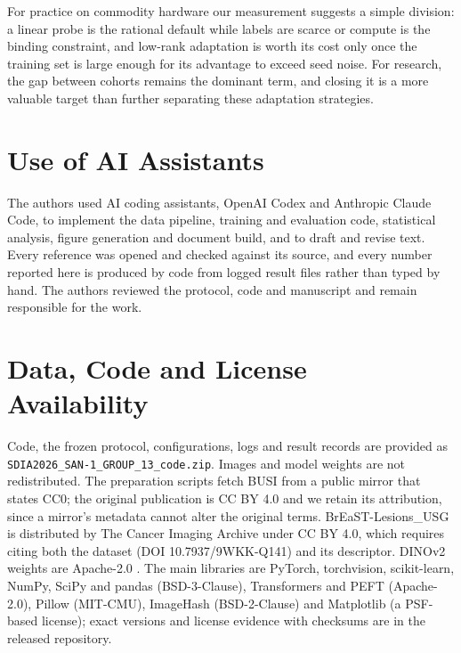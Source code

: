 \documentclass[conference,a4paper]{IEEEtran}
\begin{document}
For practice on commodity hardware our measurement suggests a simple division: a
linear probe is the rational default while labels are scarce or compute is the
binding constraint, and low-rank adaptation is worth its cost only once the
training set is large enough for its advantage to exceed seed noise. For
research, the gap between cohorts remains the dominant term, and closing it is a
more valuable target than further separating these adaptation strategies.

\section*{Use of AI Assistants}

The authors used AI coding assistants, OpenAI Codex and Anthropic Claude Code,
to implement the data pipeline, training and evaluation code, statistical
analysis, figure generation and document build, and to draft and revise text.
Every reference was opened and checked against its source, and every number
reported here is produced by code from logged result files rather than typed by
hand. The authors reviewed the protocol, code and manuscript and remain
responsible for the work.

\section*{Data, Code and License Availability}

Code, the frozen protocol, configurations, logs and result records are provided
as \texttt{SDIA2026\_SAN-1\_GROUP\_13\_code.zip}. Images and model weights are
not redistributed. The preparation scripts fetch BUSI
\cite{aldhabyani2020busi} from a public mirror that states CC0; the original
publication is CC BY 4.0 and we retain its attribution, since a mirror's
metadata cannot alter the original terms. BrEaST-Lesions\_USG
\cite{pawlowska2024breast,pawlowska2024tciadata} is distributed by The Cancer
Imaging Archive under CC BY 4.0, which requires citing both the dataset
(DOI 10.7937/9WKK-Q141) and its descriptor. DINOv2 weights are Apache-2.0
\cite{oquab2024dinov2}. The main libraries are PyTorch, torchvision,
scikit-learn, NumPy, SciPy and pandas (BSD-3-Clause), Transformers and PEFT
(Apache-2.0), Pillow (MIT-CMU), ImageHash (BSD-2-Clause) and Matplotlib (a
PSF-based license); exact versions and license evidence with checksums are in
the released repository.



\end{document}
